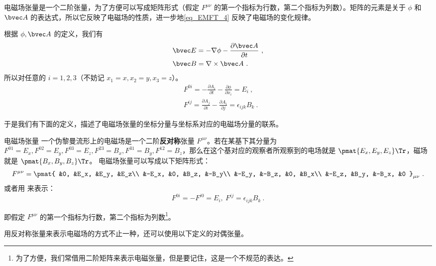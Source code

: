 电磁场张量是一个二阶张量，为了方便可以写成矩阵形式（假定 $F^{\mu\nu}$ 的第一个指标为行数，第二个指标为列数）。矩阵的元素是关于 $\phi$ 和 $\bvec A$ 的表达式，所以它反映了电磁场的性质，进一步地\autoref{eq_EMFT_4} 反映了电磁场的变化规律。

根据 $\phi,\bvec A$ 的定义，我们有
\begin{equation}
\begin{aligned}
&\bvec E=-\nabla \phi-\frac{ \partial \bvec A}{\partial t}~,
\\
&\bvec B=\nabla\times \bvec A~.
\end{aligned}
\end{equation}
所以对任意的 $i=1,2,3$（不妨记 $x_1=x,x_2=y,x_3=z$）。
\begin{equation}
\begin{aligned}
&F^{0i}=-\frac{\partial A_i}{\partial t}-\frac{\partial \phi}{\partial x_i}=E_i~,\\
&F^{ij}=\frac{\partial A_j}{\partial i}-\frac{\partial A_i}{\partial j}=\epsilon_{ijk}B_k~.
\end{aligned}
\end{equation}

于是我们有下面的定义，描述了电磁场张量的坐标分量与坐标系对应的电磁场分量的联系。

\begin{definition}{电磁场张量}
一个伪黎曼流形上的电磁场是一个二阶\textbf{反对称}张量 $F^{\mu\nu}$。若在某基下其分量为 $F^{01}=E_x, F^{02}=E_y, F^{03}=E_z, F^{23}=B_x, F^{31}=B_y, F^{12}=B_z$，那么在这个基对应的观察者所观察到的电场就是 $\pmat{E_x, E_y, E_z}\Tr$，磁场就是 $\pmat{B_x, B_y, B_z}\Tr$。
电磁场张量可以写成以下矩阵形式：
\begin{equation}\label{eq_EMFT_1}
F^{\mu\nu}=\pmat{
&0, &E_x, &E_y, &E_z\\
&-E_x, &0, &B_z, &-B_y\\
&-E_y, &-B_z, &0, &B_x\\
&-E_z, &B_y, &-B_x, &0
}_{\mu\nu}~.
\end{equation}
或者用 来表示：
\begin{equation}
F^{0 i}=-F^{i 0}=E_i,\ F^{ij}=\epsilon_{ijk}B_k~.
\end{equation}
\end{definition}
即假定 $F^{\mu\nu}$ 的第一个指标为行数，第二个指标为列数\footnote{为了方便，我们常借用二阶矩阵来表示电磁张量，但是要记住，这是一个不规范的表达。}。

用反对称张量来表示电磁场的方式不止一种，还可以使用以下定义的对偶张量。

